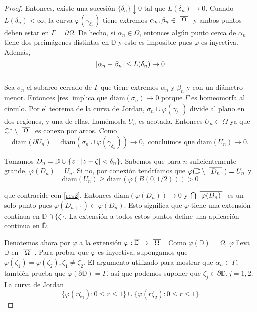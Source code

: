 \begin{proof}
    Entonces, existe una sucesión $\{ \delta_n\} \downarrow 0$ tal que $L(\delta_n) \rightarrow 0$. Cuando $L(\delta_n) < \infty$, la curva $\varphi(\gamma_{\delta_n})$ tiene extremos $\alpha_n, \beta_n \in \xbar{\Omega}$ y ambos puntos deben estar en $\Gamma = \partial \Omega$. De hecho, si $\alpha_n \in \Omega$, entonces algún punto cerca de $\alpha_n$ tiene dos preimágenes distintas en $\mathbb{D}$ y esto es imposible pues $\varphi$ es inyectiva. Además, 
    \begin{equation}\label{res}
        \left\lvert\alpha_n - \beta_n\right\rvert \leq L(\delta_n) \rightarrow 0
    \end{equation}
    \\
    Sea $\sigma_n$ el subarco cerrado de $\Gamma$ que tiene extremos $\alpha_n$ y $\beta_n$ y con un diámetro menor. Entonces \ref{res} implica que $\text{diam}(\sigma_n) \rightarrow 0$ porque $\Gamma$ es homeomorfa al círculo. Por el teorema de la curva de Jordan, $\sigma_n \cup \varphi(\gamma_{\delta_n})$ divide al plano en dos regiones, y una de ellas, llamémosla $U_n$ es acotada. Entonces $U_n \subset \Omega$ ya que $\mathbb{C}^* \setminus \xbar{\Omega}$ es conexo por arcos. Como
    \begin{equation}
        \label{res2}
        \text{diam}(\partial U_n) = \text{diam}(\sigma_n \cup \varphi(\gamma_{\delta_n})) \rightarrow 0,
        \text{ concluimos que }
        \text{diam}(U_n) \rightarrow 0.
    \end{equation} 

    Tomamos $D_n = \mathbb{D} \cup \{ z: \left\lvert z - \zeta\right\rvert < \delta_n \}$. Sabemos que para $n$ suficientemente grande, $\varphi(D_n) = U_n$. Si no, por conexión tendríamos que $\varphi(\mathbb{D} \setminus \xbar{D_n}) = U_n$ y
    \begin{equation*}
        \text{diam} (U_n) \geq \text{diam} (\varphi(B(0, 1/2))) > 0
    \end{equation*}

    que contracide con \ref{res2}. Entonces $\text{diam}(\varphi(D_n)) \rightarrow 0$ y $\bigcap \xbar{\varphi(D_n)}$ es un solo punto pues $\varphi(D_{n+1}) \subset \varphi(D_n)$. Esto significa que $\varphi$ tiene una extensión continua en $\mathbb{D} \cap \{ \zeta \}$. La extensión a todos estos puntos define una aplicación continua en $\overline{\mathbb{D}}$.

    Denotemos ahora por $\varphi$ a la extensión $\varphi : \overline{\mathbb{D}} \rightarrow \xbar{\Omega}$. Como $\varphi(\mathbb{D}) = \Omega$, $\varphi$ lleva  $\overline{\mathbb{D}}$ en $\xbar{\Omega}$. Para probar que $\varphi$ es inyectiva, supongamos que $\varphi(\zeta_1) = \varphi(\zeta_2), \zeta_1 \not = \zeta_2$. El argumento utilizado para mostrar que $\alpha_n \in \Gamma$, también prueba que $\varphi (\partial \mathbb{D}) = \Gamma$, así que podemos suponer que $\zeta_j \in \partial \mathbb{D}, j=1,2$. La curva de Jordan
    \begin{equation*}
        \{\varphi (r \zeta_1) : 0 \leq r \leq 1\} \cup \{\varphi (r \zeta_2) : 0 \leq r \leq 1\}
    \end{equation*}


\end{proof}
